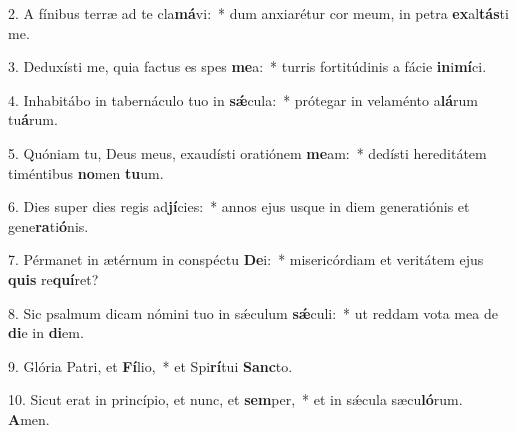2. A fínibus terræ ad te cla\textbf{má}vi:~*  dum anxiarétur cor meum, in petra \textbf{ex}al\textbf{tás}ti me.\

3. Deduxísti me, quia factus es spes \textbf{me}a:~*  turris fortitúdinis a fácie \textbf{in}i\textbf{mí}ci.\

4. Inhabitábo in tabernáculo tuo in \textbf{sǽ}cula:~*  prótegar in velaménto a\textbf{lá}rum tu\textbf{á}rum.\

5. Quóniam tu, Deus meus, exaudísti oratiónem \textbf{me}am:~*  dedísti hereditátem timéntibus \textbf{no}men \textbf{tu}um.\

6. Dies super dies regis ad\textbf{jí}cies:~*  annos ejus usque in diem generatiónis et gene\textbf{ra}ti\textbf{ó}nis.\

7. Pérmanet in ætérnum in conspéctu \textbf{De}i:~*  misericórdiam et veritátem ejus \textbf{quis} re\textbf{quí}ret?\

8. Sic psalmum dicam nómini tuo in sǽculum \textbf{sǽ}culi:~*  ut reddam vota mea de \textbf{di}e in \textbf{di}em.\

9. Glória Patri, et \textbf{Fí}lio,~*  et Spi\textbf{rí}tui \textbf{Sanc}to.\

10. Sicut erat in princípio, et nunc, et \textbf{sem}per,~*  et in sǽcula sæcu\textbf{ló}rum. \textbf{A}men.\

